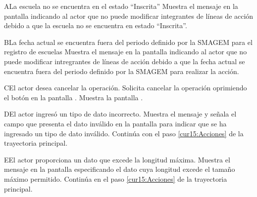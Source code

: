 
 \begin{UCtrayectoriaA}{A}{La escuela no se encuentra en el estado ``Inscrita''}
    \UCpaso[\UCsist] Muestra el mensaje  en la pantalla  indicando al actor que no puede modificar integrantes de líneas de acción debido a que la escuela no se encuentra en estado ``Inscrita''.
 \end{UCtrayectoriaA}

 \begin{UCtrayectoriaA}{B}{La fecha actual se encuentra fuera del periodo definido por la SMAGEM para el registro de escuelas}
    \UCpaso[\UCsist] Muestra el mensaje  en la pantalla  indicando al actor que no puede modificar intregrantes de líneas de acción debido a que la fecha actual se encuentra fuera del periodo definido por la SMAGEM para realizar la acción.
 \end{UCtrayectoriaA}

 \begin{UCtrayectoriaA}{C}{El actor desea cancelar la operación.}
    \UCpaso[\UCactor] Solicita cancelar la operación oprimiendo el botón  en la pantalla .
    \UCpaso[\UCsist] Muestra la pantalla .
 \end{UCtrayectoriaA}

   \begin{UCtrayectoriaA}{D}{El actor ingresó un tipo de dato incorrecto.}
    \UCpaso[\UCsist] Muestra el mensaje  y señala el campo que presenta el dato inválido en la 
    pantalla  para indicar que se ha ingresado un tipo de dato inválido.
    \UCpaso[] Continúa con el paso \ref{cur15:Acciones} de la trayectoria principal.
 \end{UCtrayectoriaA}

 \begin{UCtrayectoriaA}{E}{El actor proporciona un dato que excede la longitud máxima.}
    \UCpaso[\UCsist] Muestra el mensaje  en la pantalla  especificando el dato cuya longitud excede el tamaño máximo permitido.
   \UCpaso[] Continúa en el paso \ref{cur15:Acciones} de la trayectoria principal.
 \end{UCtrayectoriaA}

